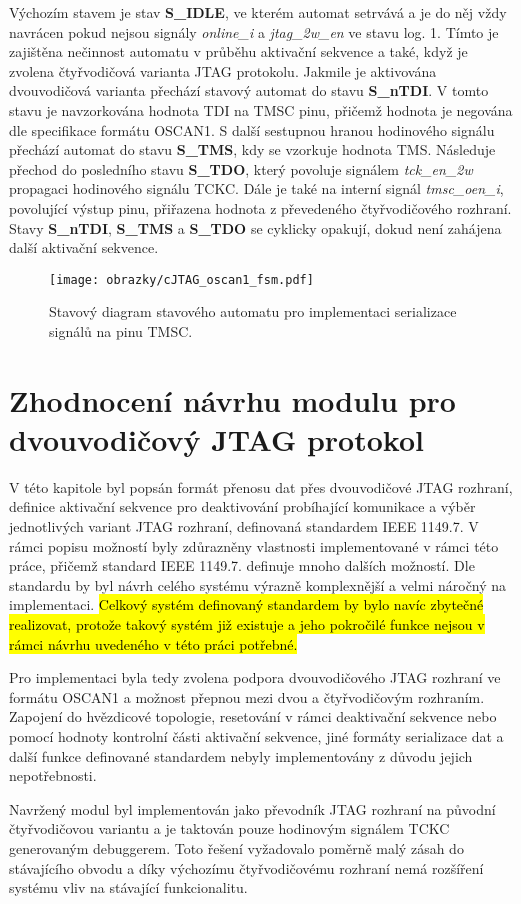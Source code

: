 Výchozím stavem je stav \textbf{S\_IDLE}, ve kterém automat setrvává a je do něj vždy navrácen pokud nejsou signály \textit{online\_i} a \textit{jtag\_2w\_en} ve stavu log. 1. Tímto je zajištěna nečinnost automatu v průběhu aktivační sekvence a také, když je zvolena čtyřvodičová varianta \acs{JTAG} protokolu. Jakmile je aktivována dvouvodičová varianta přechází stavový automat do stavu \textbf{S\_nTDI}. V tomto stavu je navzorkována hodnota TDI na \acs{TMSC} pinu, přičemž hodnota je negována dle specifikace formátu OSCAN1. S další sestupnou hranou hodinového signálu přechází automat do stavu \textbf{S\_TMS}, kdy se vzorkuje hodnota TMS. Následuje přechod do posledního stavu \textbf{S\_TDO}, který povoluje signálem \textit{tck\_en\_2w} propagaci hodinového signálu \acs{TCKC}. Dále je také na interní signál \textit{tmsc\_oen\_i}, povolující výstup pinu, přiřazena hodnota z převedeného čtyřvodičového rozhraní. Stavy \textbf{S\_nTDI}, \textbf{S\_TMS} a \textbf{S\_TDO} se cyklicky opakují, dokud není zahájena další aktivační sekvence.

\begin{figure}[!h]
  \begin{center}
    \texttt{[image: obrazky/cJTAG\_oscan1\_fsm.pdf]}
  \end{center}
  \caption{Stavový diagram stavového automatu pro implementaci serializace signálů na pinu \acs{TMSC}.}
	\label{fig:cJTAG_oscan1_fsm}
\end{figure}

\section{Zhodnocení návrhu modulu pro dvouvodičový \acs{JTAG} protokol}
V této kapitole byl popsán formát přenosu dat přes dvouvodičové \acs{JTAG} rozhraní, definice aktivační sekvence pro deaktivování probíhající komunikace a výběr jednotlivých variant \acs{JTAG} rozhraní, definovaná standardem IEEE 1149.7. V rámci popisu možností byly zdůrazněny vlastnosti implementované v rámci této práce, přičemž standard IEEE 1149.7. definuje mnoho dalších možností. Dle standardu by byl návrh celého systému výrazně komplexnější a velmi náročný na implementaci. \hl{Celkový systém definovaný standardem by bylo navíc zbytečné realizovat, protože takový systém již existuje a jeho pokročilé funkce nejsou v rámci návrhu uvedeného v této práci potřebné.}

Pro implementaci byla tedy zvolena podpora dvouvodičového \acs{JTAG} rozhraní ve formátu OSCAN1 a možnost přepnou mezi dvou a čtyřvodičovým rozhraním. Zapojení do hvězdicové topologie, resetování v rámci deaktivační sekvence nebo pomocí hodnoty kontrolní části aktivační sekvence, jiné formáty serializace dat a další funkce definované standardem nebyly implementovány z důvodu jejich nepotřebnosti. \cite{IEEE_1149-7}

Navržený modul byl implementován jako převodník \acs{JTAG} rozhraní na původní čtyřvodičovou variantu a je taktován pouze hodinovým signálem \acs{TCKC} generovaným debuggerem. Toto řešení vyžadovalo poměrně malý zásah do stávajícího obvodu a díky výchozímu čtyřvodičovému rozhraní nemá rozšíření systému vliv na stávající funkcionalitu.